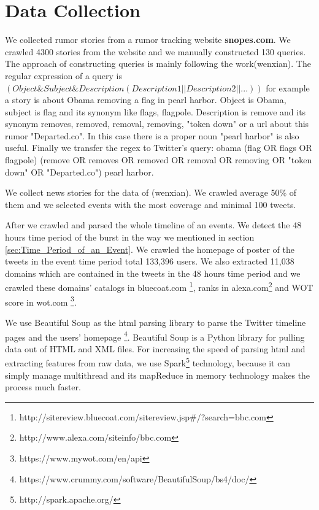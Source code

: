  
\chapter{Data Collection} %
\label{cha:Data_Collection}
We collected rumor stories from a rumor tracking website \textbf{snopes.com}. We crawled 4300 stories from the website and we manually constructed 130 queries. The approach of constructing queries is mainly following the work(wenxian). The regular expression of a query is $(Object \& Subject \& Description(Description1||Description2||...))$
for example a story is about Obama removing a flag in pearl harbor. Object is Obama, subject is flag and its synonym like flags, flagpole. Description is remove and its synonym removes, removed, removal, removing, "token down" or a url about this rumor "Departed.co". In this case there is a proper noun "pearl harbor" is also useful. Finally we transfer the regex to Twitter's query: obama (flag OR flags OR flagpole) (remove OR removes OR removed OR removal OR removing OR "token down" OR "Departed.co") pearl harbor.



We collect news stories for the data of (wenxian). We crawled average 50\% of them and we selected events with the most coverage and minimal 100 tweets. 

After we crawled and parsed the whole timeline of an events. We detect the 48 hours time period of the burst in the way we mentioned in section \ref{sec:Time_Period_of_an_Event}. We crawled the homepage of poster of the tweets in the event time period total 133,396 users. We also extracted 11,038 domains which are contained in the tweets in the 48 hours time period and we crawled these domains' catalogs in bluecoat.com \footnote{http://sitereview.bluecoat.com/sitereview.jsp\#/?search=bbc.com}, ranks in alexa.com\footnote{http://www.alexa.com/siteinfo/bbc.com} and WOT score in wot.com \footnote{https://www.mywot.com/en/api}. 

We use Beautiful Soup as the html parsing library to parse the Twitter timeline pages and the users' homepage \footnote{https://www.crummy.com/software/BeautifulSoup/bs4/doc/}. Beautiful Soup is a Python library for pulling data out of HTML and XML files. For increasing the speed of parsing html and extracting features from raw data, we use Spark\footnote{http://spark.apache.org/} technology, because it can simply manage multithread and its mapReduce in memory technology makes the process much faster.  
